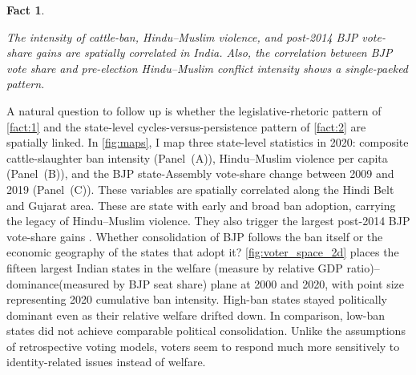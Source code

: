 \documentclass[11pt,twoside]{extarticle}
\newtheorem{fact}{Fact}
\begin{document}
\begin{fact}\label{fact:3}

The intensity of cattle-ban, Hindu--Muslim violence, and post-2014 BJP vote-share gains are spatially correlated in India. Also, the correlation between BJP vote share and pre-election Hindu--Muslim conflict intensity shows a single-paeked pattern. 

\end{fact}

A natural question to follow up is whether the legislative-rhetoric pattern of \autoref{fact:1} and the state-level cycles-versus-persistence pattern of \autoref{fact:2} are spatially linked.
In \autoref{fig:maps}, I map three state-level statistics in 2020: composite cattle-slaughter ban intensity (Panel~(A)), Hindu--Muslim violence per capita (Panel~(B)), and the BJP state-Assembly vote-share change between 2009 and 2019 (Panel~(C)).
These variables are spatially correlated along the Hindi Belt and Gujarat area. 
These are state with early and broad ban adoption, carrying the legacy of Hindu--Muslim violence. 
They also trigger the largest post-2014 BJP vote-share gains \citep*{jhaTradeInstitutionsEthnic2013}. 
Whether consolidation of BJP follows the ban itself or the economic geography of the states that adopt it?
\autoref{fig:voter_space_2d} places the fifteen largest Indian states in the welfare (measure by relative GDP ratio)--dominance(measured by BJP seat share) plane at 2000 and 2020, with point size representing 2020 cumulative ban intensity. 
High-ban states stayed politically dominant even as their relative welfare drifted down. 
In comparison, low-ban states did not achieve comparable political consolidation. 
Unlike the assumptions of retrospective voting models, voters seem to respond much more sensitively to identity-related issues instead of welfare.
\end{document}
